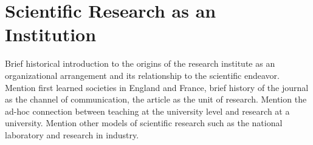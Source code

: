 \section{Scientific Research as an Institution}
Brief historical introduction to the origins of the research institute as an organizational arrangement and its relationship to the scientific endeavor. Mention first learned societies in England and France, brief history of the journal as the channel of communication, the article as the unit of research. Mention the ad-hoc connection between teaching at the university level and research at a university. Mention other models of scientific research such as the national laboratory and research in industry. 